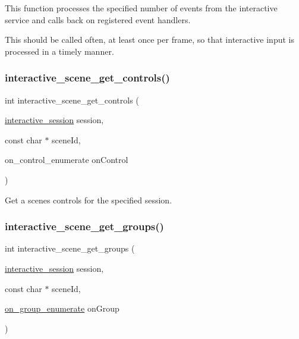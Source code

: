 This function processes the specified number of events from the interactive service and calls back on registered event handlers. 

This should be called often, at least once per frame, so that interactive input is processed in a timely manner. \mbox{\label{group___interactivity_ga9ebb3f222872c50a7316b7963cf42011}} 
\subsubsection{\texorpdfstring{interactive\+\_\+scene\+\_\+get\+\_\+controls()}{interactive\_scene\_get\_controls()}}
{\footnotesize\ttfamily int interactive\+\_\+scene\+\_\+get\+\_\+controls (\begin{DoxyParamCaption}\item[{\mbox{\hyperlink{group___interactivity_ga6d8819d38b8dc8994a2299cf22a65a31}{interactive\+\_\+session}}}]{session,  }\item[{const char $\ast$}]{scene\+Id,  }\item[{on\+\_\+control\+\_\+enumerate}]{on\+Control }\end{DoxyParamCaption})}



Get a scene\textquotesingle{}s controls for the specified session. 

\mbox{\label{group___interactivity_gab63c2b0d200d3faa4c6d296c31896352}} 
\subsubsection{\texorpdfstring{interactive\+\_\+scene\+\_\+get\+\_\+groups()}{interactive\_scene\_get\_groups()}}
{\footnotesize\ttfamily int interactive\+\_\+scene\+\_\+get\+\_\+groups (\begin{DoxyParamCaption}\item[{\mbox{\hyperlink{group___interactivity_ga6d8819d38b8dc8994a2299cf22a65a31}{interactive\+\_\+session}}}]{session,  }\item[{const char $\ast$}]{scene\+Id,  }\item[{\mbox{\hyperlink{group___interactivity_ga94f3f5e9c3f20ed45e333767263adbc2}{on\+\_\+group\+\_\+enumerate}}}]{on\+Group }\end{DoxyParamCaption})}



